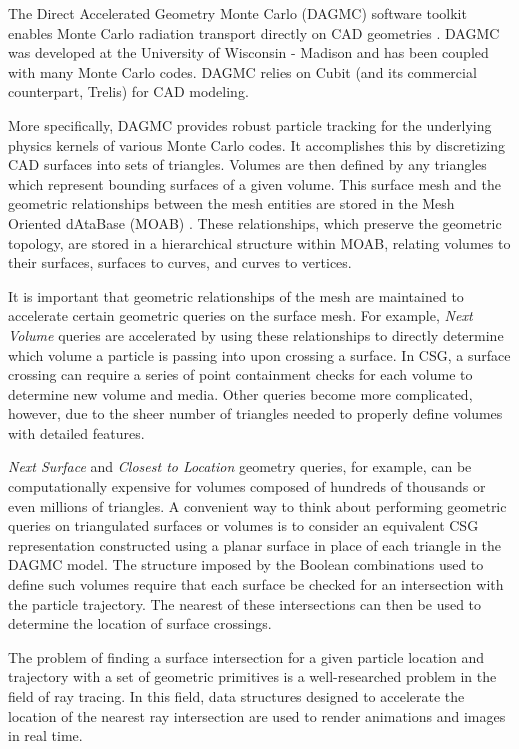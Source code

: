The Direct Accelerated Geometry Monte Carlo (DAGMC) software toolkit enables
Monte Carlo radiation transport directly on CAD geometries
\cite{Tautges_2009}. DAGMC was developed at the University of Wisconsin -
Madison and has been coupled with many Monte Carlo codes. DAGMC relies on
Cubit\cite{Blacker_1994} (and its commercial counterpart, Trelis) for CAD
modeling.

More specifically, DAGMC provides robust particle tracking for the underlying
physics kernels of various Monte Carlo codes. It accomplishes this by
discretizing CAD surfaces into sets of triangles. Volumes are then defined by
any triangles which represent bounding surfaces of a given volume. This surface
mesh and the geometric relationships between the mesh entities are stored in the
Mesh Oriented dAtaBase (MOAB) \cite{Tautges_2004}. These relationships, which
preserve the geometric topology, are stored in a hierarchical structure within
MOAB, relating volumes to their surfaces, surfaces to curves, and curves to
vertices.

It is important that geometric relationships of the mesh are maintained to
accelerate certain geometric queries on the surface mesh. For example,
\textit{Next Volume} queries are accelerated by using these relationships to
directly determine which volume a particle is passing into upon crossing a
surface. In CSG, a surface crossing can require a series of point containment
checks for each volume to determine new volume and media. Other queries become
more complicated, however, due to the sheer number of triangles needed to
properly define volumes with detailed features.

\textit{Next Surface} and \textit{Closest to Location} geometry queries, for
example, can be computationally expensive for volumes composed of hundreds of
thousands or even millions of triangles. A convenient way to think about
performing geometric queries on triangulated surfaces or volumes is to consider
an equivalent CSG representation constructed using a planar surface in place of
each triangle in the DAGMC model. The structure imposed by the Boolean
combinations used to define such volumes require that each surface be checked
for an intersection with the particle trajectory. The nearest of these
intersections can then be used to determine the location of surface crossings.

The problem of finding a surface intersection for a given particle location and
trajectory with a set of geometric primitives is a well-researched problem in
the field of ray tracing. In this field, data structures designed to accelerate
the location of the nearest ray intersection are used to render animations and
images in real time.

